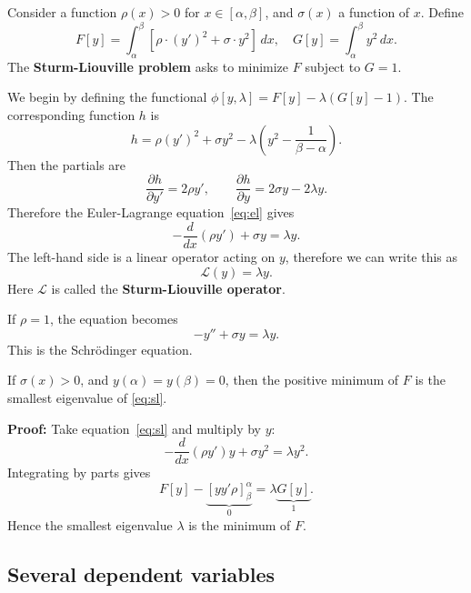 \documentclass[12pt]{article}
\theoremstyle{definition}
\theoremstyle{remark}
\begin{document}
Consider a function $\rho(x) > 0$ for $x \in [\alpha, \beta]$, and $\sigma(x)$ a function of $x$. Define
\[
	F[y] = \int_{\alpha}^{\beta} [\rho \cdot (y')^2 + \sigma \cdot y^2] \, dx, \quad G[y] = \int_{\alpha}^{\beta} y^2 \, dx
.\]
The \textbf{Sturm-Liouville problem} asks to minimize $F$ subject to $G = 1$.

We begin by defining the functional $\phi[y, \lambda] = F[y] - \lambda(G[y] - 1)$. The corresponding function $h$ is
\[
	h = \rho(y')^2 + \sigma y^2 - \lambda \left(y^2 - \frac{1}{\beta - \alpha} \right)
.\]
Then the partials are
\[
	\frac{\partial h}{\partial y'} = 2 \rho y', \qquad \frac{\partial h}{\partial y} = 2 \sigma y - 2 \lambda y
.\]
Therefore the Euler-Lagrange equation~\eqref{eq:el} gives
\[
	- \frac{d}{dx} (\rho y') + \sigma y = \lambda y \tag{3.2}\label{eq:sl}
.\]
The left-hand side is a linear operator acting on $y$, therefore we can write this as
\[
	\mathcal{L}(y) = \lambda y
.\]
Here $\mathcal{L}$ is called the \textbf{Sturm-Liouville operator}.

If $\rho = 1$, the equation becomes 
\[
-y'' + \sigma y = \lambda y
.\]
This is the Schr\"{o}dinger equation.

If $\sigma(x) > 0$, and $y(\alpha) = y(\beta) = 0$, then the positive minimum of $F$ is the smallest eigenvalue of \eqref{eq:sl}.

\begin{adjustbox}{minipage = \columnwidth - 25.5pt, margin=1em, frame=1pt, margin=0em}
	\textbf{Proof:} Take equation~\eqref{eq:sl} and multiply by $y$:
	\[
		- \frac{d}{dx} (\rho y') y + \sigma y^2 = \lambda y^2
	.\]
	Integrating by parts gives
	\[
		F[y] - \underbrace{\left[yy'\rho\right]_{\beta}^{\alpha}}_{0} = \lambda \underbrace{G[y]}_{1}
	.\]
	Hence the smallest eigenvalue $\lambda$ is the minimum of $F$.
\end{adjustbox}

\subsection{Several dependent variables}%
\label{sub:several_dependent_variables}
\end{document}
